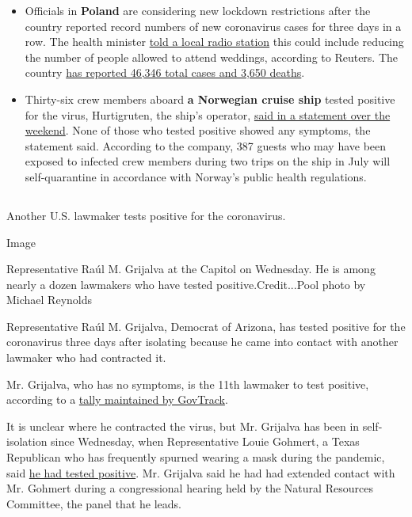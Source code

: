 \begin{itemize}
\item
  Officials in \textbf{Poland} are considering new lockdown restrictions
  after the country reported record numbers of new coronavirus cases for
  three days in a row. The health minister
  \href{https://news.yahoo.com/poland-reports-record-rise-virus-090641415.html}{told
  a local radio station} this could include reducing the number of
  people allowed to attend weddings, according to Reuters. The country
  \href{https://www.nytimes.com/interactive/2020/world/coronavirus-maps.html\#countries}{has
  reported 46,346 total cases and 3,650 deaths}.
\item
  Thirty-six crew members aboard \textbf{a Norwegian cruise ship} tested
  positive for the virus, Hurtigruten, the ship's operator,
  \href{https://presse.hurtigruten.no/pressreleases/33-hurtigruten-crew-members-tested-positive-for-covid-19-3024215}{said
  in a statement over the weekend}. None of those who tested positive
  showed any symptoms, the statement said. According to the company, 387
  guests who may have been exposed to infected crew members during two
  trips on the ship in July will self-quarantine in accordance with
  Norway's public health regulations.
\end{itemize}

\hypertarget{-4}{%
\subsection{}\label{-4}}

Another U.S. lawmaker tests positive for the coronavirus.

Image

Representative Raúl M. Grijalva at the Capitol on Wednesday. He is among
nearly a dozen lawmakers who have tested positive.Credit...Pool photo by
Michael Reynolds

Representative Raúl M. Grijalva, Democrat of Arizona, has tested
positive for the coronavirus three days after isolating because he came
into contact with another lawmaker who had contracted it.

Mr. Grijalva, who has no symptoms, is the 11th lawmaker to test
positive, according to a
\href{https://slack-redir.net/link?url=https\%3A\%2F\%2Fwww.govtrack.us\%2Fcovid-19\%23legislators}{tally
maintained by GovTrack}.

It is unclear where he contracted the virus, but Mr. Grijalva has been
in self-isolation since Wednesday, when Representative Louie Gohmert, a
Texas Republican who has frequently spurned wearing a mask during the
pandemic, said
\href{https://www.nytimes.com/2020/07/29/us/politics/louie-gohmert-positive-coronavirus-mask.html}{he
had tested positive}. Mr. Grijalva said he had had extended contact with
Mr. Gohmert during a congressional hearing held by the Natural Resources
Committee, the panel that he leads.

